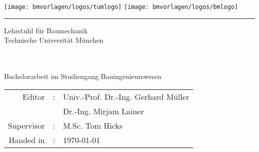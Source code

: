 {
\begin{titlepage}
	
	\begin{center}
		{
			\fontsize{18}{18}\selectfont 
			
			\texttt{[image: bmvorlagen/logos/tumlogo]} \hfill \texttt{[image: bmvorlagen/logos/bmlogo]}
			\vspace{0.5cm}
			\hrule
			
			\vspace{1cm}
			Lehrstuhl für Baumechanik\\
			Technische Universität München\\
			
			\vspace{1.4cm}
			
			\vspace{2cm}
			
			
			\vspace{3mm}
			
			
			
			\bmtitle \\[5ex]
			
			
			\bmauthor \\[7ex]
			
			
			Bachelorarbeit im Studiengang Bauingenieurswesen\\

			
			\vspace{1.8cm}
			
			{\fontsize{12pt}{12} \selectfont%
				\begin{tabular}{rll}
					Editor&:& Univ.-Prof. Dr.-Ing. Gerhard Müller\\
					& & Dr.-Ing. Mirjam Lainer\\[0.5ex]
					Supervisor&:& M.Sc. Tom Hicks\\[0.5ex]
					Handed in&:& \today
				\end{tabular}
			}
			
			
		}
	\end{center}
	
\end{titlepage}
}

